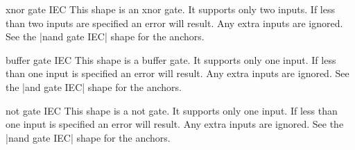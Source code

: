 \begin{shape}{xnor gate IEC}
  This shape is an xnor gate. It supports only two inputs.
  If less than two inputs are specified an error will result.
  Any extra inputs are ignored.  
	See the |nand gate IEC| shape for the anchors.
	
\begin{codeexample}[]
\end{codeexample}

\end{shape}

\begin{shape}{buffer gate IEC}
   This shape is a buffer gate. It supports only one input.
  If less than one input is specified an error will result.
  Any extra inputs are ignored. 
	See the |and gate IEC| shape for the anchors.

\begin{codeexample}[]
\end{codeexample}

\end{shape}


\begin{shape}{not gate IEC}
  This shape is a not gate. It supports only one input.
  If less than one input is specified an error will result.
  Any extra inputs are ignored. 
  See the |nand gate IEC| shape for the anchors.

\begin{codeexample}[]
\end{codeexample}


\end{shape}





